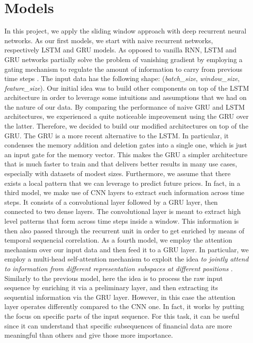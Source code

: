 \documentclass{article}
\begin{document}
\section{Models}

In this project, we apply the sliding window approach with deep recurrent neural networks. As our first models, we start with naive recurrent networks, respectively LSTM and GRU models. As opposed to vanilla RNN, LSTM and GRU networks partially solve the problem of vanishing gradient by employing a gating mechanism to regulate the amount of information to carry from previous time steps \cite{vanishing}.
The input data has the following shape: (\emph{batch\_size}, \emph{window\_size}, \emph{feature\_size}).
Our initial idea was to build other components on top of the LSTM architecture in order to leverage some intuitions
and assumptions that we had on the nature of our data. By comparing the performance of naive GRU and LSTM
architectures, we experienced a quite noticeable improvement using the GRU over the latter. Therefore, we decided
to build our modified architectures on top of the GRU. The GRU is a more recent alternative to the LSTM.
In particular, it condenses the memory addition and deletion gates into a single one, which is just an input gate
for the memory vector. This makes the GRU a simpler architecture that is much faster to train and that delivers
better results in many use cases, especially with datasets of modest sizes.
Furthermore, we assume that there exists a local pattern that we can leverage to predict future prices.
In fact, in a third model, we make use of CNN layers to extract such information across
time steps. It consists of a convolutional layer followed by a GRU layer, then connected
to two dense layers. The convolutional layer is meant to extract high level patterns that
form across time steps inside a window. This information is then also passed through the
recurrent unit in order to get enriched by means of temporal sequencial correlation.
As a fourth model, we employ the attention mechanism over our input
data and then feed it to a GRU layer. In particular, we employ a multi-head
self-attention mechanism to exploit the idea \emph{to jointly attend to information from different
representation subspaces at different positions} \cite{46201}. Similarly to the previous
model, here the idea is to process the raw input sequence by enriching it via a preliminary
layer, and then extracting its sequential information via the GRU layer. However, in this
case the attention layer operates differently compared to the CNN one. In fact, it works
by putting the focus on specific parts of the input sequence. For this task, it can be useful
since it can understand that specific subsequences of financial data are more meaningful than
others and give those more importance.    
\end{document}
